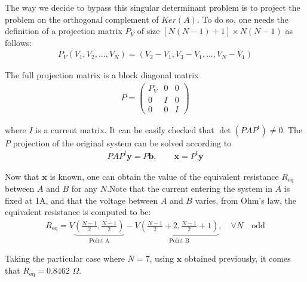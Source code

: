 \documentclass{article}
\begin{document}
\begin{spacing}{1.1}
The way we decide to bypass this singular determinant problem is to project the problem on the orthogonal complement of $Ker(A)$. To do so, one needs the definition of a projection matrix $P_V$ of size $[N(N-1)+1]\times N(N-1)$ as follows:\\
 
\begin{gather}
P_V(V_1,V_2,...,V_N)=(V_2-V_1,V_3-V_1,...,V_N-V_1)
\end{gather}


\noindent The full projection matrix is a block diagonal matrix\\

\begin{gather}
P=
    \begin{pmatrix}
    P_V&0&0\\
    0&I&0\\
    0&0&I
    \end{pmatrix}
\end{gather}

\noindent where $I$ is a current matrix. It can be easily checked that $\det(PAP^t)\neq0$. The $P$ projection of the original system can be solved according to \\

\begin{gather}\label{system projection}
    PAP^t\mathbf{y}=P\mathbf{b},\qquad \mathbf{x}=P^t\mathbf{y}
\end{gather}

\noindent Now that $\mathbf{x}$ is known, one can obtain the value of the equivalent resistance $R_{\text{eq}}$ between $A$ and $B$ for any $N$.Note that the current entering the system in $A$ is fixed at 1A, and that the voltage between $A$ and $B$ varies, from Ohm's law, the equivalent resistance is computed to be: \\


\begin{gather}\label{req}   R_{\text{eq}}=V\underbrace{\left(\frac{N-1}{2},\frac{N-1}{2}\right)}_{\text{Point A}}-V\underbrace{\left(\frac{N-1}{2}+2,\frac{N-1}{2}+1\right)}_{\text{Point B}},\quad\forall N\quad\text{odd}
\end{gather}

\noindent Taking the particular case where $N=7$, using $\mathbf{x}$ obtained previously, it comes that $R_{\text{eq}}=0.8462$ $\Omega$.\\



\end{spacing}
\end{document}
